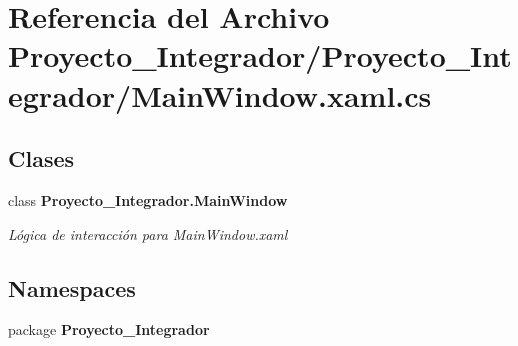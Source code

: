 \section{Referencia del Archivo Proyecto\-\_\-\-Integrador/\-Proyecto\-\_\-\-Integrador/\-Main\-Window.xaml.\-cs}
\label{_main_window_8xaml_8cs}
\subsection*{Clases}
\begin{DoxyCompactItemize}
\item 
class {\bf Proyecto\-\_\-\-Integrador.\-Main\-Window}
\begin{DoxyCompactList}\small\item\em Lógica de interacción para Main\-Window.\-xaml \end{DoxyCompactList}\end{DoxyCompactItemize}
\subsection*{Namespaces}
\begin{DoxyCompactItemize}
\item 
package {\bf Proyecto\-\_\-\-Integrador}
\end{DoxyCompactItemize}
